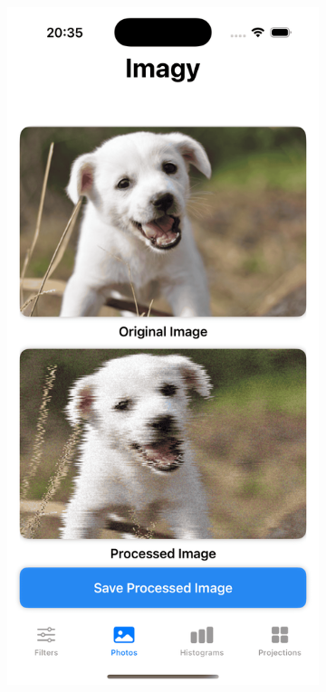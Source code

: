 \documentclass[a4paper]{article}
\begin{document}
\begin{figure}[H]
    \centering
    \begin{subfigure}{0.2\textwidth}
        \centering
        \includegraphics[width=\linewidth]{images/dog_glitch.png}

\end{subfigure}
\end{figure}
\end{document}
